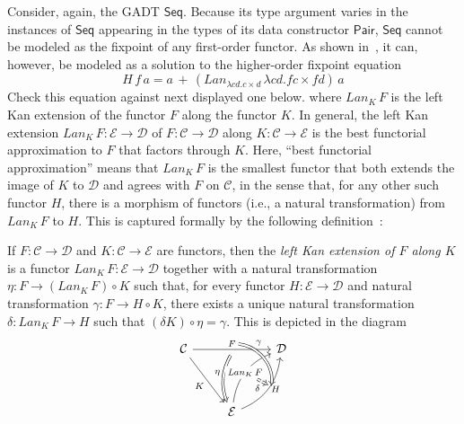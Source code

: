 \documentclass[acmsmall,screen,review,anonymous]{acmart}
\theoremstyle{definition}
\newcommand{\cal}{\mathcal}
\begin{document}
Consider, again, the GADT $\mathsf{Seq}$. Because its type argument
varies in the instances of $\mathsf{Seq}$ appearing in the types of
its data constructor $\mathsf{Pair}$, $\mathsf{Seq}$ cannot be
modeled as the fixpoint of any first-order functor. As shown
in~\cite{jp19}, it can, however, be modeled as a solution to the
higher-order fixpoint equation
\[H\,f\,a = a \,+\,(Lan_{\lambda c d. c \times d}\, \lambda
c d. f c \times f d)\,a\] {\color{red} Check this equation against
  next displayed one below.}  where $Lan_K \,F$ is the left Kan
extension of the functor $F$ along the functor $K$. In general, the
left Kan extension $Lan_K \,F : {\cal E} \to {\cal D}$ of $F : {\cal
  C} \to {\cal D}$ along $K : {\cal C} \to {\cal E}$ is the best
functorial approximation to $F$ that factors through $K$. Here, ``best
functorial approximation'' means that $Lan_K \,F$ is the smallest
functor that both extends the image of $K$ to $\cal D$ and agrees with
$F$ on $\cal C$, in the sense that, for any other such functor $H$,
there is a morphism of functors (i.e., a natural transformation) from
$Lan_K \,F$ to $H$. This is captured formally by the following
definition~\cite{mac71}:
\begin{definition}\label{def:lke}
If $F : {\cal C} \to {\cal D}$ and $K : {\cal C} \to {\cal E}$ are
functors, then the {\em left Kan extension of $F$ along $K$} is a
functor $\mathit{Lan}_K\,F : {\cal E} \to {\cal D}$ together with a
natural transformation $\eta : F \to (\mathit{Lan}_K\,F) \circ K$ such
that, for every functor $H : {\cal E} \to {\cal D}$ and natural
transformation $\gamma : F \to H \circ K$, there exists a unique
natural transformation $\delta : \mathit{Lan}_K\,F \to H$ such that
$(\delta K) \circ \eta = \gamma$. This is depicted in the diagram
\[\begin{tikzcd}[row sep = huge]
{\cal C}
\ar[rr, "{F}"{name=Fa, above}, ""{name=F, below}]
\ar[rd, "{K}"']
&& {\cal D} \\
& {\cal E}
\ar[Rightarrow, bend right = 25, from=F, "{\eta}"']
\ar[ur, bend left, "{\mathit{Lan}_{K}\,F}"{name=Lan, description}]
\ar[ur, bend right, "{H}"'{name=L, right}, ""'{name=Lr, right}]
\ar[Rightarrow, bend left = 45, from=Fa, to=Lr, "{\gamma}" near start]
\ar[Rightarrow, dashed, from=Lan, to=L, "{\delta}"']
\end{tikzcd}\]
\end{definition}
\end{document}
